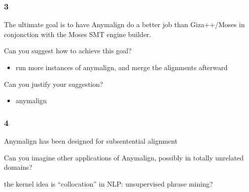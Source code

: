 \begin{frame}\frametitle{3}

\begin{block}{The ultimate goal is to have Anymalign do a better job
than Giza++/Moses in conjonction with the Moses SMT engine builder.}

\end{block}

\begin{block}{Can you suggest how to achieve this goal?}

\begin{itemize}
\itemsep1pt\parskip0pt
\item
  run more instances of anymalign, and merge the alignments afterward
\end{itemize}

\end{block}

\begin{block}{Can you justify your suggestion?}

\begin{itemize}
\itemsep1pt\parskip0pt
\item
  anymalign
\end{itemize}

\end{block}

\end{frame}

\begin{frame}\frametitle{4}

Anymalign has been designed for subsentential alignment

Can you imagine other applications of Anymalign, possibly in totally
unrelated domains?

the kernel idea is ``collocation'' in NLP: unsupervised phrase mining?

\end{frame}

